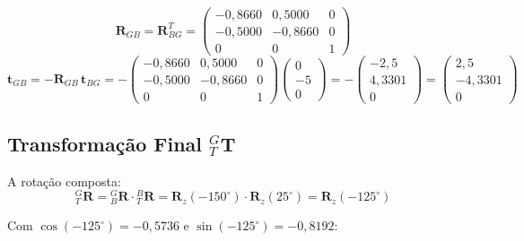 \documentclass[12pt,a4paper]{article}
\newcommand{\Rot}[2]{{}^{#1}_{#2}\!\mathbf{R}}
\newcommand{\Rz}[1]{\mathbf{R}_z(#1)}
\newcommand{\degr}{^{\circ}}
\begin{document}
\[
  \mathbf{R}_{GB} = \mathbf{R}_{BG}^T =
  \begin{pmatrix}
   -0{,}8660 & 0{,}5000 & 0 \\
   -0{,}5000 &-0{,}8660 & 0 \\
    0        & 0        & 1
  \end{pmatrix}
\]
\[
  \mathbf{t}_{GB} = -\mathbf{R}_{GB}\,\mathbf{t}_{BG}
  = -\begin{pmatrix}-0{,}8660&0{,}5000&0\\-0{,}5000&-0{,}8660&0\\0&0&1\end{pmatrix}
  \begin{pmatrix}0\\-5\\0\end{pmatrix}
  = -\begin{pmatrix}-2{,}5\\4{,}3301\\0\end{pmatrix}
  = \begin{pmatrix}2{,}5\\-4{,}3301\\0\end{pmatrix}
\]

\subsection{Transformação Final ${}^{G}_{T}\mathbf{T}$}

A rotação composta:
\[
  \Rot{G}{T} = \Rot{G}{B}\cdot\Rot{B}{T} = \Rz{-150\degr}\cdot\Rz{25\degr} = \Rz{-125\degr}
\]

Com $\cos(-125\degr) = -0{,}5736$ e $\sin(-125\degr) = -0{,}8192$:
\end{document}
